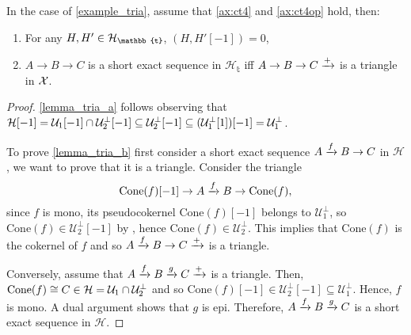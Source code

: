 \begin{lemma}\label{lemma_tria}
  In the case of \cref{example_tria}, assume that \ref{ax:ct4} and \ref{ax:ct4op} hold, then:
  \begin{enumerate}
    \item\label{lemma_tria_a} For any $H,H'\in\H_\mathbb{t}$, $(H,H'[-1])=0$,
    \item\label{lemma_tria_b} $A\to B\to C$ is a short exact sequence in $\mathcal{H}_\mathbb{t}$ iff $A\to B\to C\xrightarrow{+}$ is
    a triangle in $\mathcal X$.
  \end{enumerate}
\end{lemma}

\begin{proof}
  \ref{lemma_tria_a} follows observing that
  $\mathcal H[-1]=\mathcal{U}_1[-1]\cap\mathcal{U}_2^\perp[-1]\subseteq \mathcal{U}_2^\perp[-1]\subseteq(\mathcal{U}_1^\perp[1])[-1]=\mathcal{U}_1^\perp$.

  To prove \ref{lemma_tria_b} first consider a short exact sequence $A\xrightarrow{f} B\to C$ in $\mathcal{H}$, we want to
  prove that it is a triangle. Consider the triangle
  \begin{equation*}
    \mathrm{Cone}(f)[-1]\to A\xrightarrow{f} B \to \mathrm{Cone}(f),
  \end{equation*}
  since $f$ is mono, its pseudocokernel $\mathrm{Cone}(f)[-1]$ belongs to $\mathcal{U}_1^\perp$, so
  $\mathrm{Cone}(f)\in\mathcal{U}_2^\perp[-1]$ by \triangb, hence $\mathrm{Cone}(f)\in\mathcal{U}_2^\perp$.
  This implies that $\mathrm{Cone}(f)$ is the cokernel of $f$ and so $A\xrightarrow{f} B\to C\xrightarrow{+}$ is a triangle.

  Conversely, assume that $A\xrightarrow{f} B\xrightarrow{g} C\xrightarrow{+}$ is a triangle. Then, $\mathrm{Cone}(f)\cong C\in\mathcal H=\mathcal{U}_1\cap\mathcal{U}_2^\perp$ and
  so $\mathrm{Cone}(f)[-1]\in\mathcal{U}_2^\perp[-1]\subseteq \mathcal{U}_1^\perp$. Hence, $f$ is mono. A dual argument
  shows that $g$ is epi. Therefore, $A\xrightarrow{f} B\xrightarrow{g} C$ is a short exact sequence in $\mathcal{H}$.
\end{proof}

